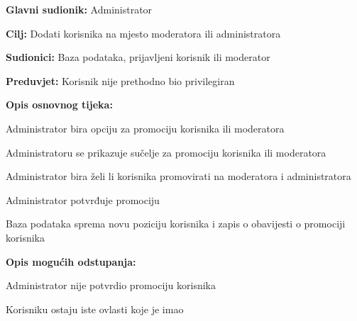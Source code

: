 \noindent {}
\begin{packed_item}

\item \textbf{Glavni sudionik:} Administrator
\item  \textbf{Cilj:} Dodati korisnika na mjesto moderatora ili administratora
\item  \textbf{Sudionici:} Baza podataka, prijavljeni korisnik ili moderator
\item  \textbf{Preduvjet:} Korisnik nije prethodno bio privilegiran
\item  \textbf{Opis osnovnog tijeka:}

\item[] \begin{packed_enum}

    \item Administrator bira opciju za promociju korisnika ili moderatora
    \item Administratoru se prikazuje sučelje za promociju korisnika ili moderatora
    \item Administrator bira želi li korisnika promovirati na moderatora i administratora
    \item Administrator potvrđuje promociju
    \item Baza podataka sprema novu poziciju korisnika i zapis o obavijesti o promociji korisnika

\end{packed_enum}

\item  \textbf{Opis mogućih odstupanja:}

\item[] \begin{packed_item}

    \item[4.a] Administrator nije potvrdio promociju korisnika
    \item[] \begin{packed_enum}

        \item Korisniku ostaju iste ovlasti koje je imao

    \end{packed_enum}

\end{packed_item}
\end{packed_item}

